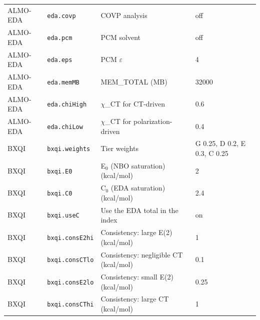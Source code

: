 {\begin{longtable}{llp{4.2cm}l}
ALMO-EDA & \texttt{eda.covp} & COVP analysis & \parbox[t]{5.0cm}{\raggedright off}\\
ALMO-EDA & \texttt{eda.pcm} & PCM solvent & \parbox[t]{5.0cm}{\raggedright off}\\
ALMO-EDA & \texttt{eda.eps} & PCM $\varepsilon$ & \parbox[t]{5.0cm}{\raggedright 4}\\
ALMO-EDA & \texttt{eda.memMB} & MEM\_TOTAL (MB) & \parbox[t]{5.0cm}{\raggedright 32000}\\
ALMO-EDA & \texttt{eda.chiHigh} & $\chi$\_CT for CT-driven & \parbox[t]{5.0cm}{\raggedright 0.6}\\
ALMO-EDA & \texttt{eda.chiLow} & $\chi$\_CT for polarization-driven & \parbox[t]{5.0cm}{\raggedright 0.4}\\
BXQI & \texttt{bxqi.weights} & Tier weights & \parbox[t]{5.0cm}{\raggedright G 0.25, D 0.2, E 0.3, C 0.25}\\
BXQI & \texttt{bxqi.E0} & E$_0$ (NBO saturation) (kcal/mol) & \parbox[t]{5.0cm}{\raggedright 2}\\
BXQI & \texttt{bxqi.C0} & C$_0$ (EDA saturation) (kcal/mol) & \parbox[t]{5.0cm}{\raggedright 2.4}\\
BXQI & \texttt{bxqi.useC} & Use the EDA total in the index & \parbox[t]{5.0cm}{\raggedright on}\\
BXQI & \texttt{bxqi.consE2hi} & Consistency: large E(2) (kcal/mol) & \parbox[t]{5.0cm}{\raggedright 1}\\
BXQI & \texttt{bxqi.consCTlo} & Consistency: negligible CT (kcal/mol) & \parbox[t]{5.0cm}{\raggedright 0.1}\\
BXQI & \texttt{bxqi.consE2lo} & Consistency: small E(2) (kcal/mol) & \parbox[t]{5.0cm}{\raggedright 0.25}\\
BXQI & \texttt{bxqi.consCThi} & Consistency: large CT (kcal/mol) & \parbox[t]{5.0cm}{\raggedright 1}\\
\end{longtable}}
